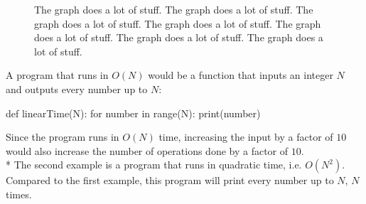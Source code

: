 \documentclass[main.tex]{subfiles}
\begin{document}
\begin{figure}[h]
    \begin{center}
    \end{center}
\caption{The graph does a lot of stuff. The graph does a lot of stuff. The graph does a lot of stuff. The graph does a lot of stuff. The graph does a lot of stuff. The graph does a lot of stuff. The graph does a lot of stuff.}
\end{figure}

\vspace{10mm}

A program that runs in $O(N)$ would be a function that inputs an integer $N$ and outputs every number up to $N$:
\begin{python}
def linearTime(N):
    for number in range(N):
        print(number)
\end{python}

Since the program runs in $O(N)$ time, increasing the input by a factor of $10$ would also increase the number of operations done by a factor of $10$.
\newline
\\*
The second example is a program that runs in quadratic time, i.e. $O(N^{2})$. Compared to the first example, this program will print every number up to $N$, $N$ times.
\end{document}
